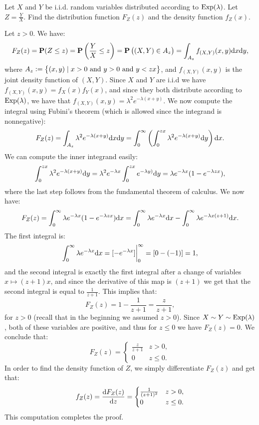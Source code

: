 \documentclass[11pt,a4paper]{article}
\begin{document}
\begin{exercise}
  Let $X$ and $Y$ be i.i.d. random variables distributed
  according to $\operatorname{Exp}(\lambda)$.
  Let $Z = \frac{Y}{X}$.
  Find the distribution function $F_Z(z)$ and the density function $f_Z(x)$.
\end{exercise}
\begin{solution}
  Let $z > 0$.
  We have:
  \[
    F_Z(z) =
    \Prob(Z \le z) =
    \Prob\left(\frac{Y}{X} \le z\right) =
    \Prob\del{(X,Y) \in A_z} =
    \int_{A_z} f_{(X,Y)}(x,y) \dx \dy,
  \]
  where $A_z := \left\{(x,y) \mid x > 0 \text{ and } y > 0 \text{ and } y < zx\right\}$,
  and $f_{(X,Y)}(x,y)$ is the joint density function of $(X,Y)$.
  Since $X$ and $Y$ are i.i.d we have $f_{(X,Y)}(x,y) = f_X(x) f_Y(x)$,
  and since they both distribute according to $\operatorname{Exp}(\lambda)$,
  we have that $f_{(X,Y)}(x,y) = \lambda^2 e^{-\lambda(x + y)}$.
  We now compute the integral using Fubini's theorem (which is allowed
  since the integrand is nonnegative):
  \[
    F_Z(z) =
    \int_{A_z} \lambda^2 e^{-\lambda(x + y)} \dx \dy =
    \int_{0}^{\infty} \del{\int_{0}^{zx} \lambda^2 e^{-\lambda(x + y)} \dy} \dx.
  \]
  We can compute the inner integrand easily:
  \[
    \int_{0}^{zx} \lambda^2 e^{-\lambda(x + y)} \dy =
    \lambda^2 e^{-\lambda x} \int_{0}^{zx}  e^{-\lambda y)} \dy =
    \lambda e^{-\lambda x} (1 - e^{-\lambda z x}),
  \]
  where the last step follows from the fundamental theorem of calculus.
  We now have:
  \[
    F_Z(z) =
    \int_{0}^{\infty} \lambda e^{-\lambda x} (1 - e^{-\lambda z x}) \dx =
    \int_{0}^{\infty} \lambda e^{-\lambda x} \dx
      - \int_{0}^{\infty} \lambda e^{-\lambda x(z + 1)} \dx.
  \]
  The first integral is:
  \[
    \int_{0}^{\infty} \lambda e^{-\lambda x} \dx =
    [-e^{-\lambda x}]\biggr\vert^{\infty}_{0} = [0 - (-1)] = 1,
  \]
  and the second integral is exactly the first integral after a change of
  variables $x \mapsto (z+1)x$, and since the derivative of this map
  is $(z + 1)$ we get that the second integral is equal to $\frac{1}{z + 1}$.
  This implies that:
  \[
    F_Z(z) = 1 - \frac{1}{z+1} = \frac{z}{z + 1},
  \]
  for $z > 0$ (recall that in the beginning we assumed $z > 0$).
  Since $X \sim Y \sim \operatorname{Exp}(\lambda)$, both of these variables are positive,
  and thus for $z \le 0$ we have $F_Z(z) = 0$.
  We conclude that:
  \[
    F_Z(z) =
    \begin{cases}
      \frac{z}{z + 1} &z > 0, \\
      0 &z \le 0.
    \end{cases}
  \]
  In order to find the density function of $Z$,
  we simply differentiate $F_Z(z)$ and get that:
  \[
    f_Z(z) = \frac{\mathrm{d} F_Z(z)}{\mathrm{d} z} =
    \begin{cases}
      \frac{1}{(z + 1)^2} &z > 0, \\
      0 &z \le 0.
    \end{cases}
  \]
  This computation completes the proof.
\end{solution}
\end{document}
